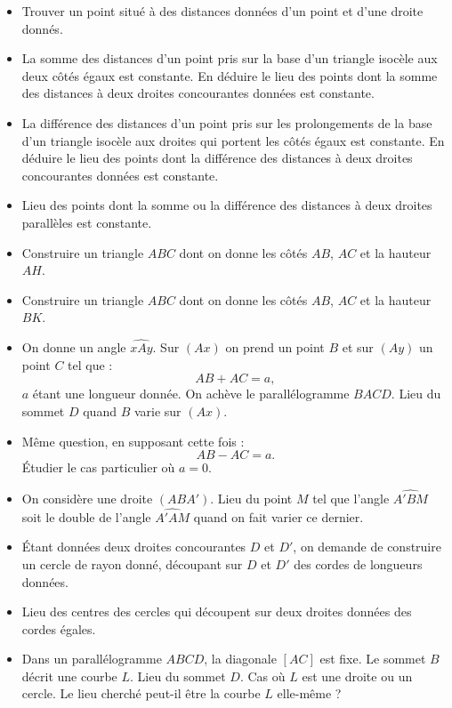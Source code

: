 \documentclass[12 pt]{report}
\theoremstyle{plain}
\newcounter{n}
\renewcommand{\it}{\item[$\mathbf{\then}.$]\stepcounter{n} }
\begin{document}
 \begin{itemize}
 \it Trouver un point situé à des distances données d'un point et d'une droite donnés. 
 \it La somme des distances d'un point pris sur la base d'un triangle 
 isocèle aux deux côtés égaux est constante. En déduire le lieu des points dont la somme des distances à deux droites concourantes données
 est constante.
 \it La différence des distances d'un point pris sur les prolongements de la base d'un triangle isocèle aux droites qui portent les côtés égaux est constante. En déduire le lieu des points dont la différence des distances à deux droites concourantes données est constante. 
 \it Lieu des points dont la somme ou la différence des distances à deux droites parallèles est constante. 
 \it Construire un triangle $ABC$ dont on donne les côtés $AB$, $AC$ et la hauteur $AH$. 
 \it Construire un triangle $ABC$ dont on donne les côtés $AB$, $AC$ et la hauteur $BK$. 
 \it On donne un angle $\widehat{xAy}$. Sur $(Ax)$ on prend un point $B$ et sur $(Ay)$ un point $C$ tel que : 
 \[ AB + AC = a, \] $a$ étant une longueur donnée. On achève le parallélogramme $BACD$. Lieu du sommet $D$ quand $B$ varie sur $(Ax)$. 
 \it Même question, en supposant cette fois : \[AB - AC = a.\] Étudier le cas particulier où $a=0$. 
 \it On considère une droite $(ABA')$. Lieu du point $M$ tel que l'angle $\widehat{A'BM}$ soit le double de l'angle $\widehat{A'AM}$ quand on fait varier ce dernier. 
 \it Étant données deux droites concourantes $D$ et $D'$, on demande de 
 construire un cercle de rayon donné, découpant sur $D$ et $D'$ des cordes de longueurs données. 
 \it Lieu des centres des cercles qui découpent sur deux droites données des cordes égales. 
 \it Dans un parallélogramme $ABCD$, la diagonale $[AC]$ est fixe. Le sommet $B$ décrit une courbe $L$. Lieu du sommet $D$. Cas où $L$ est une droite ou un cercle. Le lieu cherché peut-il être la courbe $L$ elle-même ? 
 \end{itemize}
 
\end{document}
